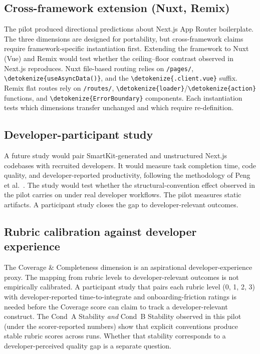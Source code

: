 \documentclass[12pt,a4paper]{report}
\newcommand{\code}[1]{\texttt{\nolinkurl{\detokenize{#1}}}}
\DeclareRobustCommand{\filename}[1]{\bgroup\urlstyle{tt}\nolinkurl{#1}\egroup}
\begin{document}
\subsection{Cross-framework extension (Nuxt, Remix)}

The pilot produced directional predictions about Next.js App Router boilerplate. The three dimensions are designed for portability, but cross-framework claims require framework-specific instantiation first. Extending the framework to Nuxt (Vue) and Remix would test whether the ceiling--floor contrast observed in Next.js reproduces. Nuxt file-based routing relies on \filename{/pages/}, \code{useAsyncData()}, and the \code{.client.vue} suffix. Remix flat routes rely on \filename{/routes/}, \code{loader}/\code{action} functions, and \code{ErrorBoundary} components. Each instantiation tests which dimensions transfer unchanged and which require re-definition.

\subsection{Developer-participant study}

A future study would pair SmartKit-generated and unstructured Next.js codebases with recruited developers. It would measure task completion time, code quality, and developer-reported productivity, following the methodology of Peng et al.~\parencite{peng2023impact}. The study would test whether the structural-convention effect observed in the pilot carries on under real developer workflows. The pilot measures static artifacts. A participant study closes the gap to developer-relevant outcomes.

\subsection{Rubric calibration against developer experience}

The Coverage \& Completeness dimension is an aspirational developer-experience proxy. The mapping from rubric levels to developer-relevant outcomes is not empirically calibrated. A participant study that pairs each rubric level (0, 1, 2, 3) with developer-reported time-to-integrate and onboarding-friction ratings is needed before the Coverage score can claim to track a developer-relevant construct. The Cond~A Stability {\it and} Cond~B Stability observed in this pilot (under the scorer-reported numbers) show that explicit conventions produce stable rubric scores across runs. Whether that stability corresponds to a developer-perceived quality gap is a separate question.
\end{document}
